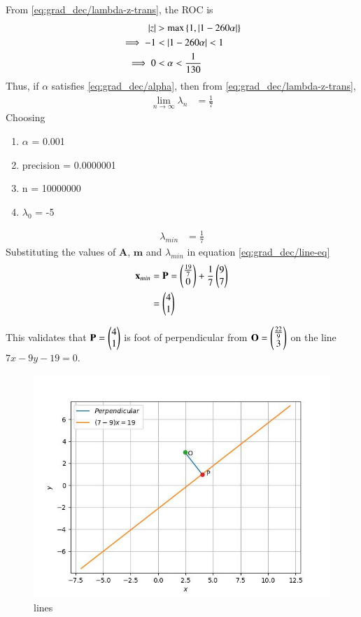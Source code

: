 \documentclass[journal,12pt,twocolumn]{IEEEtran}
\renewcommand{\vec}[1]{\boldsymbol{\mathbf{#1}}}
\begin{document}
From \eqref{eq:grad_dec/lambda-z-trans}, the ROC is
\begin{align}
	\left\vert z\right\vert &> \max\left\{1,\left\vert1- 260\alpha\right\vert\right\} \\
	\implies -1 & < \left\vert1-260\alpha\right\vert < 1 \\
        \label{eq:grad_dec/alpha}
        \implies 0 &< \alpha < \frac{1}{130}
\end{align}
Thus, if $\alpha$ satisfies \eqref{eq:grad_dec/alpha}, then from \eqref{eq:grad_dec/lambda-z-trans}, 
\begin{align}
	\label{eq:grad_dec/conv}
        \lim_{n\to\infty}\lambda_n &= \frac{1}{7}
    \end{align}
Choosing
\begin{enumerate}
 \item $\alpha$ = 0.001
 \item precision = 0.0000001
 \item n = 10000000 
 \item $\lambda_0$ = -5 
\end{enumerate}

\begin{align}
	\lambda_{min} &= \frac{1}{7}
\end{align}
Substituting the values of $\vec{A}$, $\vec{m}$ and $\lambda_{min}$ in equation \eqref{eq:grad_dec/line-eq} 
\begin{align}
	\vec{x}_{min} &= \vec{P} = \myvec{\frac{19}{7} \\ 0} +  \frac{1}{7}\myvec{9 \\ 7}  \\
	&= \myvec{4 \\ 1}
\end{align}

This validates that $\vec{P} = \myvec{4\\1}$ is foot of perpendicular from $\vec{O} = \myvec{\frac{22}{9} \\ 3}$ on the line $7{x} - 9{y} - 19 = 0$.
\begin{figure}[!htb]
    \centering
    \includegraphics[width=\columnwidth]{figs/lines.jpg}
    \caption{lines}
    \label{fig:lines}
\end{figure}
\end{document}
